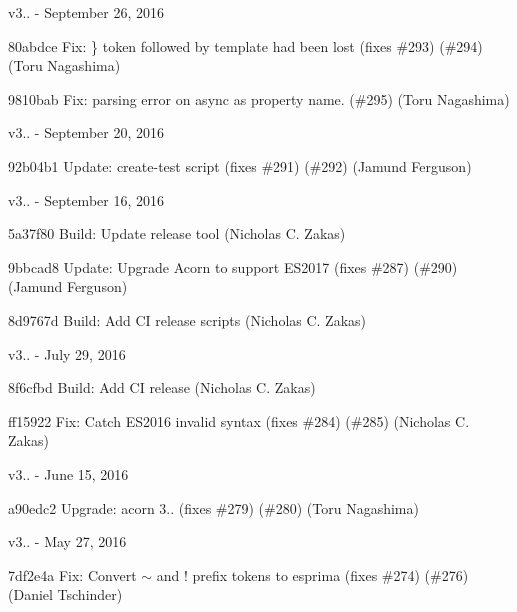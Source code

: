 v3.. -\/ September 26, 2016


\begin{DoxyItemize}
\item 80abdce Fix\+: {\ttfamily \}} token followed by template had been lost (fixes \#293) (\#294) (Toru Nagashima)
\item 9810bab Fix\+: parsing error on {\ttfamily async} as property name. (\#295) (Toru Nagashima)
\end{DoxyItemize}

v3.. -\/ September 20, 2016


\begin{DoxyItemize}
\item 92b04b1 Update\+: create-\/test script (fixes \#291) (\#292) (Jamund Ferguson)
\end{DoxyItemize}

v3.. -\/ September 16, 2016


\begin{DoxyItemize}
\item 5a37f80 Build\+: Update release tool (Nicholas C. Zakas)
\item 9bbcad8 Update\+: Upgrade Acorn to support E\+S2017 (fixes \#287) (\#290) (Jamund Ferguson)
\item 8d9767d Build\+: Add CI release scripts (Nicholas C. Zakas)
\end{DoxyItemize}

v3.. -\/ July 29, 2016


\begin{DoxyItemize}
\item 8f6cfbd Build\+: Add CI release (Nicholas C. Zakas)
\item ff15922 Fix\+: Catch E\+S2016 invalid syntax (fixes \#284) (\#285) (Nicholas C. Zakas)
\end{DoxyItemize}

v3.. -\/ June 15, 2016


\begin{DoxyItemize}
\item a90edc2 Upgrade\+: acorn 3.. (fixes \#279) (\#280) (Toru Nagashima)
\end{DoxyItemize}

v3.. -\/ May 27, 2016


\begin{DoxyItemize}
\item 7df2e4a Fix\+: Convert $\sim$ and ! prefix tokens to esprima (fixes \#274) (\#276) (Daniel Tschinder)
\end{DoxyItemize}


